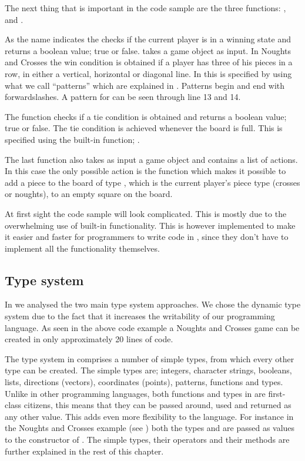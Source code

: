 The next thing that is important in the code sample are the three functions: 
,  and . 

As the name indicates the  checks if the current player
is in a winning state and returns a boolean value; true or false.
 takes a game object as input. In Noughts and Crosses the
win condition is obtained if a player has three of his pieces in a row, in
either a vertical, horizontal or diagonal line. In \productname{} this is
specified by using what we call ``patterns'' which are explained in
. Patterns begin and end with forwardslashes. A pattern for
 can be seen through line 13 and 14.

The  function checks if a tie condition is obtained and
returns a boolean value; true or false. The tie condition is achieved whenever
the board is full. This is specified using the built-in function;
. 

The last function  also takes as input a game object and
contains a list of actions. In this case the only possible action is the
 function which makes it possible to add a piece to the
board of type , which is the current player's piece type (crosses
or noughts), to an empty square on the board.

At first sight the code sample will look complicated. This is mostly due to the
overwhelming use of built-in functionality. This is however implemented to make
it easier and faster for programmers to write code in \productname{}, since they
don't have to implement all the functionality themselves.

\subsection*{Type system}

In  we analysed the two main type system
approaches.  We chose the dynamic type system due to the fact that it increases
the writability of our programming language. As seen in the above code example
 a Noughts and Crosses game can be created in only
approximately 20 lines of code.

The type system in \productname{} comprises a number of simple types, from which
every other type can be created. The simple types are; integers, character
strings, booleans, lists, directions (vectors), coordinates (points), patterns,
functions and types. Unlike in other programming languages, both functions and
types in \productname{} are first-class citizens, this means that they can
be passed around, used and returned as any other value. This adds even more
flexibility to the language. For instance in the Noughts and Crosses example
(see ) both the types  and
 are passed as values to the constructor of . The
simple types, their operators and their methods are further explained in the
rest of this chapter.

